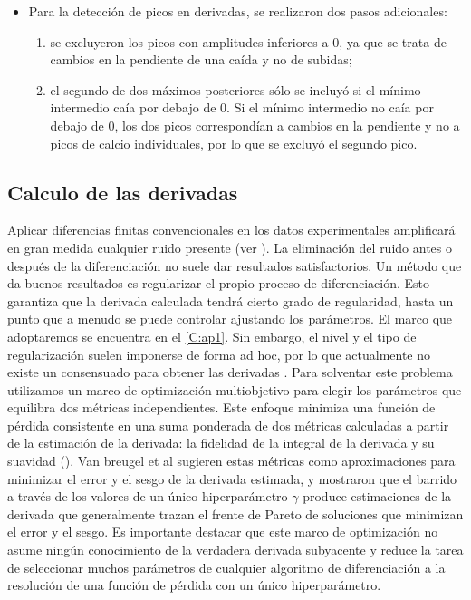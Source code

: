 \begin{enumerate}
\begin{itemize}
		\item Para la detección de picos en derivadas, se realizaron dos pasos adicionales:
		\begin{enumerate}[label=(\roman*)]
			\item se excluyeron los picos con amplitudes inferiores a 0, ya que se trata de cambios en la pendiente de una caída y no de subidas; 
			\item el segundo de dos máximos posteriores sólo se incluyó si el mínimo intermedio caía por debajo de 0. Si el mínimo intermedio no caía por debajo de 0, los dos picos correspondían a cambios en la pendiente y no a picos de calcio individuales, por lo que se excluyó el segundo pico.
		\end{enumerate}
		
	\end{itemize}
\end{enumerate}



\subsection{Calculo de las derivadas}


Aplicar diferencias finitas convencionales en los datos experimentales amplificará en gran medida cualquier ruido presente  (ver  ). La eliminación del ruido antes o después de la diferenciación no suele dar resultados satisfactorios. Un método que da buenos resultados es regularizar el propio proceso de diferenciación. Esto garantiza que la derivada calculada tendrá cierto grado de regularidad, hasta un punto que a menudo se puede controlar ajustando los parámetros. El marco que adoptaremos se encuentra en el \cref{C:ap1}. Sin embargo, el nivel y el tipo de regularización suelen imponerse de forma ad hoc, por lo que actualmente no existe un  consensuado para obtener las derivadas . Para solventar este problema utilizamos un marco de optimización multiobjetivo para elegir los parámetros que equilibra dos métricas independientes.  Este enfoque minimiza una función de pérdida consistente en una suma ponderada de dos métricas calculadas a partir de la estimación de la derivada: la fidelidad de la integral de la derivada y su suavidad (). Van breugel et al \cite{van_breugel_numerical_2020} sugieren estas métricas como aproximaciones para minimizar el error y el sesgo de la derivada estimada, y mostraron  que el barrido a través de los valores de un único hiperparámetro $\gamma$ produce estimaciones de la derivada que generalmente trazan el frente de Pareto de soluciones que minimizan el error y el sesgo. Es importante destacar que este marco de optimización no asume ningún conocimiento de la verdadera derivada subyacente y reduce la tarea de seleccionar muchos parámetros de cualquier algoritmo de diferenciación a la resolución de una función de pérdida con un único hiperparámetro. 



